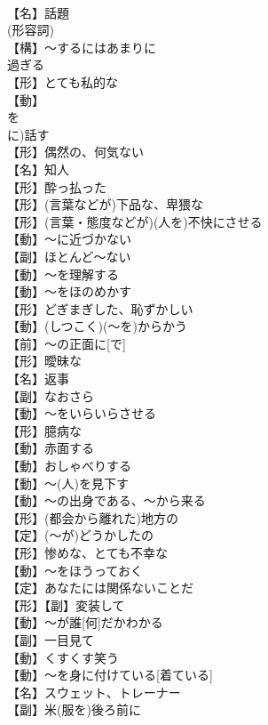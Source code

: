 \documentclass[8pt]{extreport}
\begin{document}
\begin{CJK}{UTF8}{min}
\\	【名】話題
\\	(形容詞) 
\\	【構】～するにはあまりに
\\	過ぎる
\\	【形】とても私的な
\\	【動】
\\	を
\\	に)話す
\\	【形】偶然の、何気ない
\\	【名】知人
\\	【形】酔っ払った
\\	【形】(言葉などが)下品な、卑猥な
\\	【形】(言葉・態度などが)(人を)不快にさせる
\\	【動】～に近づかない
\\	【副】ほとんど～ない
\\	【動】～を理解する
\\	【動】～をほのめかす
\\	【形】どぎまぎした、恥ずかしい
\\	【動】(しつこく)(～を)からかう
\\	【前】～の正面に[で]
\\	【形】曖昧な
\\	【名】返事
\\	【副】なおさら
\\	【動】～をいらいらさせる
\\	【形】臆病な
\\	【動】赤面する
\\	【動】おしゃべりする
\\	【動】～(人)を見下す
\\	【動】～の出身である、～から来る
\\	【形】(都会から離れた)地方の
\\	【定】(～が)どうかしたの
\\	【形】惨めな、とても不幸な
\\	【動】～をほうっておく
\\	【定】あなたには関係ないことだ
\\	【形】【副】変装して
\\	【動】～が誰[何]だかわかる
\\	【副】一目見て
\\	【動】くすくす笑う
\\	【動】～を身に付けている[着ている]
\\	【名】スウェット、トレーナー
\\	【副】{米}(服を)後ろ前に

\end{CJK}
\end{document}
